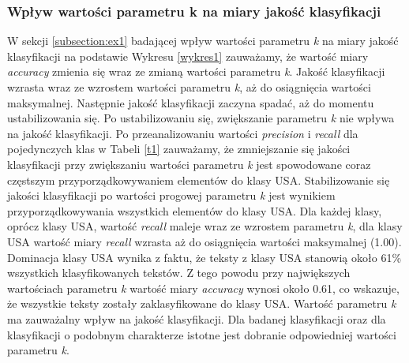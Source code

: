 \documentclass{classrep}
\begin{document}
\subsubsection{Wpływ wartości parametru k na miary jakość klasyfikacji}
W sekcji \ref{subsection:ex1} badającej wpływ wartości parametru \textit{k} na miary jakość klasyfikacji na podstawie Wykresu \ref{wykres1} zauważamy, że wartość miary \textit{accuracy} zmienia się wraz ze zmianą wartości parametru \textit{k}. Jakość klasyfikacji wzrasta wraz ze wzrostem wartości parametru \textit{k}, aż do osiągnięcia wartości maksymalnej. Następnie jakość klasyfikacji zaczyna spadać, aż do momentu ustabilizowania się. Po ustabilizowaniu się, zwiększanie parametru \textit{k} nie wpływa na jakość klasyfikacji. Po przeanalizowaniu wartości \textit{precision} i \textit{recall} dla pojedynczych klas w Tabeli \ref{t1} zauważamy, że zmniejszanie się jakości klasyfikacji przy zwiększaniu wartości parametru \textit{k} jest spowodowane coraz częstszym przyporządkowywaniem elementów do klasy USA. Stabilizowanie się jakości klasyfikacji po wartości progowej parametru \textit{k} jest wynikiem przyporządkowywania wszystkich elementów do klasy USA. Dla każdej klasy, oprócz klasy USA, wartość \textit{recall} maleje wraz ze wzrostem parametru \textit{k}, dla klasy USA wartość miary \textit{recall} wzrasta aż do osiągnięcia wartości maksymalnej (1.00). Dominacja klasy USA wynika z faktu, że teksty z klasy USA stanowią około 61\% wszystkich klasyfikowanych tekstów. Z tego powodu przy największych wartościach parametru \textit{k} wartość miary \textit{accuracy} wynosi około 0.61, co wskazuje, że wszystkie teksty zostały zaklasyfikowane do klasy USA. Wartość parametru \textit{k} ma zauważalny wpływ na jakość klasyfikacji. Dla badanej klasyfikacji oraz dla klasyfikacji o podobnym charakterze istotne jest dobranie odpowiedniej wartości parametru \textit{k}.

\end{document}
